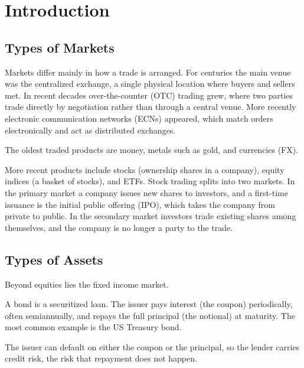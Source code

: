 
\section{Introduction}

\medskip

\subsection{Types of Markets}

Markets differ mainly in how a trade is arranged. For centuries the main venue was the centralized exchange, a single physical location where buyers and sellers met. In recent decades over-the-counter (OTC) trading grew, where two parties trade directly by negotiation rather than through a central venue. More recently electronic communication networks (ECNs) appeared, which match orders electronically and act as distributed exchanges.

The oldest traded products are money, metals such as gold, and currencies (FX).

More recent products include stocks (ownership shares in a company), equity indices (a basket of stocks), and ETFs. Stock trading splits into two markets. In the primary market a company issues new shares to investors, and a first-time issuance is the initial public offering (IPO), which takes the company from private to public. In the secondary market investors trade existing shares among themselves, and the company is no longer a party to the trade.

\bigskip

\subsection{Types of Assets}

Beyond equities lies the fixed income market.

\begin{definition}[Bond]
A bond is a securitized loan. The issuer pays interest (the coupon) periodically, often semiannually, and repays the full principal (the notional) at maturity. The most common example is the US Treasury bond.
\end{definition}

The issuer can default on either the coupon or the principal, so the lender carries credit risk, the risk that repayment does not happen.

